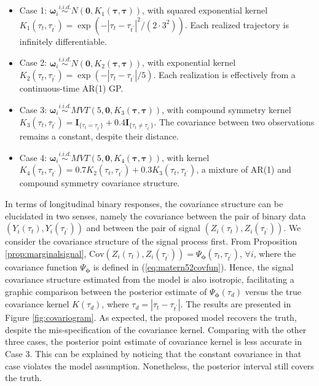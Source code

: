 \begin{itemize}
\item Case 1: $\boldsymbol{\omega}_i\stackrel{i.i.d.}{\sim} N(\mathbf{0},K_1(\boldsymbol{\tau},\boldsymbol{\tau}))$, with squared exponential kernel $K_1(\tau_{t},\tau_{t^{\prime}})=\exp(-|\tau_t-\tau_{t^{\prime}}|^2/(2\cdot 3^2))$. Each realized trajectory is infinitely differentiable. 
\item Case 2:  $\boldsymbol{\omega}_i\stackrel{i.i.d.}{\sim} N(\mathbf{0},K_2(\boldsymbol{\tau},\boldsymbol{\tau}))$, with exponential kernel $K_2(\tau_{t},\tau_{t^{\prime}})=\exp(-|\tau_t-\tau_{t^{\prime}}|/5)$. Each realization is effectively from a continuous-time AR(1) GP.
\item Case 3:  $\boldsymbol{\omega}_i\stackrel{i.i.d.}{\sim} MVT(5,\mathbf{0},K_3(\boldsymbol{\tau},\boldsymbol{\tau}))$, with compound symmetry kernel $K_3(\tau_{t},\tau_{t^{\prime}})=\mathbf{I}_{\{\tau_t=\tau_{t^{\prime}}\}}+0.4\mathbf{I}_{\{\tau_t\neq\tau_{t^{\prime}}\}}$. The covariance between two observations remains a constant, despite their distance.
\item Case 4: $\boldsymbol{\omega}_i\stackrel{i.i.d.}{\sim} MVT(5,\mathbf{0},K_4(\boldsymbol{\tau},\boldsymbol{\tau}))$, with kernel $K_4(\tau_{t},\tau_{t^{\prime}})=0.7K_2(\tau_{t},\tau_{t^{\prime}})+0.3K_3(\tau_{t},\tau_{t^{\prime}})$, a mixture of AR(1) and compound symmetry covariance structure.
\end{itemize}

In terms of longitudinal binary responses, the covariance structure can be elucidated in two senses, namely the covariance between the pair of binary data $(Y_i(\tau_{t}),Y_i(\tau_{t^{\prime}}))$ and between the pair of signal $(Z_i(\tau_t),Z_i(\tau_{t^{\prime}}))$. We consider the covariance structure of the signal process first. From Proposition \ref{prop:marginalsignal}, $\text{Cov}(Z_i(\tau_t),Z_i(\tau_{t^{\prime}}))=\Psi_{\boldsymbol{\phi}}(\tau_t,\tau_{t^{\prime}})$, $\forall i$, where the covariance function $\Psi_{\boldsymbol{\phi}}$ is defined in (\ref{eq:matern52covfun}). Hence, the signal covariance structure estimated from the model is also isotropic, facilitating a graphic comparison between the posterior estimate of  $\Psi_{\boldsymbol{\phi}}(\tau_d)$ versus the true covariance kernel $K(\tau_d)$, where $\tau_d=|\tau_t-\tau_{t^{\prime}}|$. The results are presented in Figure \ref{fig:covariogram}. As expected, the proposed model recovers the truth, despite the mis-specification of the covariance kernel. Comparing with the other three cases, the posterior point estimate of covariance kernel is less accurate in Case 3. This can be explained by noticing that the constant covariance in that case violates the model assumption. Nonetheless, the posterior interval still covers the truth. 

